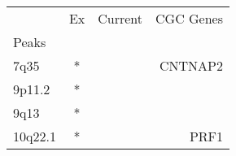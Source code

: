\begin{tabular}{lccr}
\toprule
{} & Ex & Current & CGC Genes \\
Peaks   &    &         &           \\
\midrule
7q35    &  * &         &   CNTNAP2 \\
9p11.2  &  * &         &           \\
9q13    &  * &         &           \\
10q22.1 &  * &         &      PRF1 \\
\bottomrule
\end{tabular}

